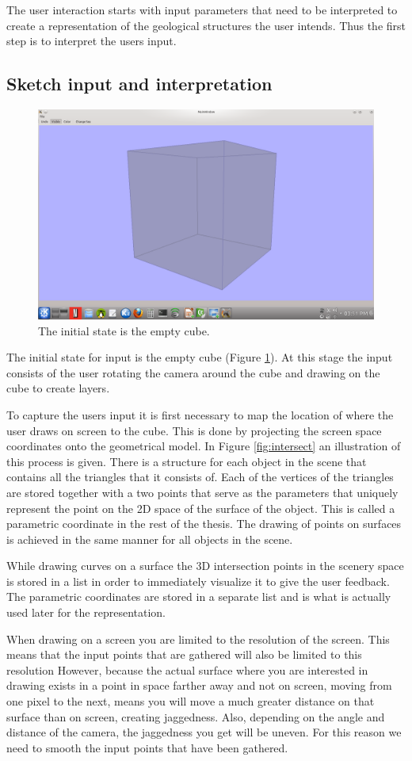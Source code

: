 \documentclass[a4paper,12pt]{report}
\begin{document}
The user interaction starts with input parameters that need to be interpreted to create a representation of the geological structures the user intends. Thus the first step is to interpret the users input.

\subsection{Sketch input and interpretation}

\begin{figure}
\centering
 \includegraphics[trim = 50mm 30mm 50mm 30mm, clip,width=0.5\linewidth]{thesis/emptyCube.png}
 \caption{The initial state is the empty cube.}
 \label{fig:emptyCube}
\end{figure}
The initial state for input is the empty cube (Figure \ref{fig:emptyCube}). At this stage the input consists of the user rotating the camera around the cube and drawing on the cube to create layers. 

 To capture the users input it is first necessary to map the location of where the user draws on screen to the cube.  This is done by projecting the screen space coordinates onto the geometrical model. In Figure \ref{fig:intersect} an illustration of this process is given. There is a structure for each object in the scene that contains all the triangles that it consists of. Each of the vertices of the triangles are stored together with a two points that serve as the parameters that uniquely represent the point on the 2D space of the surface of the object. This is called a parametric coordinate in the rest of the thesis. The drawing of points on surfaces is achieved in the same manner for all objects in the scene.
 

 
While drawing curves on a surface the 3D intersection points in the scenery space is stored in a list in order to immediately visualize it to give the user feedback. The parametric coordinates are stored in a separate list and is what is actually used later for the representation.

When drawing on a screen you are limited to the resolution of the screen. This means that the input points that are gathered will also be limited to this resolution However, because the actual surface where you are interested in drawing exists in a point in space farther away and not on screen, moving from one pixel to the next, means you will move a much greater distance on that surface than on screen, creating jaggedness. Also, depending on the angle and distance of the camera, the jaggedness you get will be uneven. For this reason we need to smooth the input points that have been gathered. 
\end{document}
